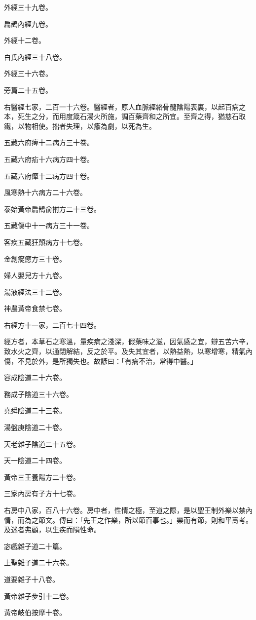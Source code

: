 \begin{pinyinscope}
外經三十九卷。

扁鵲內經九卷。

外經十二卷。

白氏內經三十八卷。

外經三十六卷。

旁篇二十五卷。

右醫經七家，二百一十六卷。醫經者，原人血脈經絡骨髓陰陽表裏，以起百病之本，死生之分，而用度箴石湯火所施，調百藥齊和之所宜。至齊之得，猶慈石取鐵，以物相使。拙者失理，以瘉為劇，以死為生。

五藏六府痺十二病方三十卷。

五藏六府疝十六病方四十卷。

五藏六府癉十二病方四十卷。

風寒熱十六病方二十六卷。

泰始黃帝扁鵲俞拊方二十三卷。

五藏傷中十一病方三十一卷。

客疾五藏狂顛病方十七卷。

金創瘲瘛方三十卷。

婦人嬰兒方十九卷。

湯液經法三十二卷。

神農黃帝食禁七卷。

右經方十一家，二百七十四卷。

經方者，本草石之寒溫，量疾病之淺深，假藥味之滋，因氣感之宜，辯五苦六辛，致水火之齊，以通閉解結，反之於平。及失其宜者，以熱益熱，以寒增寒，精氣內傷，不見於外，是所獨失也。故諺曰：「有病不治，常得中醫。」

容成陰道二十六卷。

務成子陰道三十六卷。

堯舜陰道二十三卷。

湯盤庚陰道二十卷。

天老雜子陰道二十五卷。

天一陰道二十四卷。

黃帝三王養陽方二十卷。

三家內房有子方十七卷。

右房中八家，百八十六卷。房中者，性情之極，至道之際，是以聖王制外樂以禁內情，而為之節文。傳曰：「先王之作樂，所以節百事也。」樂而有節，則和平壽考。及迷者弗顧，以生疾而隕性命。

宓戲雜子道二十篇。

上聖雜子道二十六卷。

道要雜子十八卷。

黃帝雜子步引十二卷。

黃帝岐伯按摩十卷。


\end{pinyinscope}
